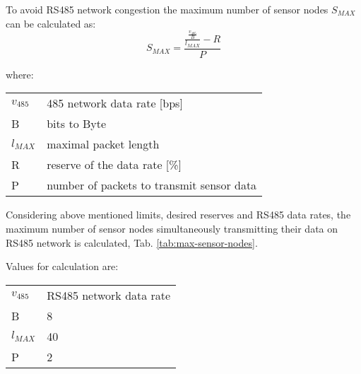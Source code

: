 To avoid RS485 network congestion the maximum number of sensor nodes $ S_{MAX} $ can be calculated as:
\begin{equation}
S_{MAX} = \frac{\frac{\frac{v_{485}}{B}}{l_{MAX}} - R}{P}
\label{equ:max-count-of-sensors}
\end{equation}

where:

\begin{tabular}{l @{  } l}
$v_{485}$ & 485 network data rate [bps]\\
 B        & bits to Byte \\
$l_{MAX}$ & maximal packet length \\
 R        & reserve of the data rate [\%]\\
 P        & number of packets to transmit sensor data \\
\end{tabular}

Considering above mentioned limits, desired reserves and RS485 data rates, the maximum number of sensor nodes simultaneously transmitting their data on RS485 network is calculated, Tab. \ref{tab:max-sensor-nodes}.

Values for calculation are:

\begin{tabular}{l @{ $=$ } l}
$v_{485}$ & RS485 network data rate \\
 B        & 8 \\
$l_{MAX}$ & 40 \\
 P        & 2 \\
\end{tabular}

